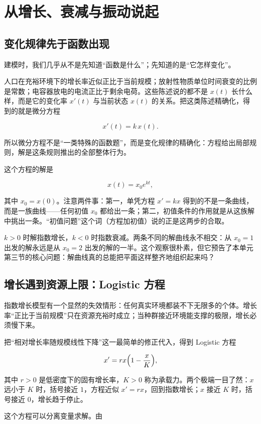 \section{从增长、衰减与振动说起}

\subsection{变化规律先于函数出现}

建模时，我们几乎从不是先知道``函数是什么''；先知道的是``它怎样变化''。

人口在充裕环境下的增长率近似正比于当前规模；放射性物质单位时间衰变的比例是常数；电容器放电的电流正比于剩余电荷。这些陈述说的都不是 \(x(t)\) 长什么样，而是它的变化率 \(x'(t)\) 与当前状态 \(x(t)\) 的关系。把这类陈述精确化，得到的就是微分方程

\[
x'(t)=k\,x(t).
\]

所以微分方程不是``一类特殊的函数题''，而是变化规律的精确化：方程给出局部规则，解是这条规则推出的全部整体行为。

这个方程的解是

\[
x(t)=x_0e^{kt},
\]

其中 \(x_0=x(0)\)。注意两件事：第一，单凭方程 \(x'=kx\) 得到的不是一条曲线，而是一族曲线——任何初值 \(x_0\) 都给出一条；第二，初值条件的作用就是从这族解中挑出一条。``初值问题''这个词（方程加初值）说的正是这两步的合取。

\(k>0\) 时解指数增长，\(k<0\) 时指数衰减。两条不同的解曲线永不相交：从 \(x_0=1\) 出发的解永远是从 \(x_0=2\) 出发的解的一半。这个观察很朴素，但它预告了本单元第三节的核心问题：解曲线真的总能把平面这样整齐地组织起来吗？

\subsection{增长遇到资源上限：Logistic 方程}

指数增长模型有一个显然的失效情形：任何真实环境都装不下无限多的个体。增长率``正比于当前规模''只在资源充裕时成立；当种群接近环境能支撑的极限，增长必须慢下来。

把``相对增长率随规模线性下降''这一最简单的修正代入，得到 Logistic 方程

\[
x'=rx\Bigl(1-\frac{x}{K}\Bigr),
\]

其中 \(r>0\) 是低密度下的固有增长率，\(K>0\) 称为承载力。两个极端一目了然：\(x\) 远小于 \(K\) 时，括号接近 \(1\)，方程近似 \(x'=rx\)，回到指数增长；\(x\) 接近 \(K\) 时，括号接近 \(0\)，增长趋于停止。

这个方程可以分离变量求解。由

